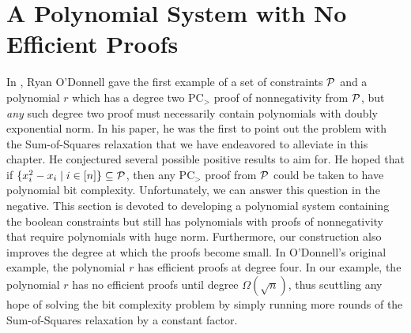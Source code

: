 \section{A Polynomial System with No Efficient Proofs}
In \cite{ODon16}, Ryan O'Donnell gave the first example of a set of constraints $\mathcal P$ and a polynomial $r$ which has a degree two PC$_>$ proof of nonnegativity from $\mathcal P$, but \emph{any} such degree two proof must necessarily contain polynomials with doubly exponential norm. In his paper, he was the first to point out the problem with the Sum-of-Squares relaxation that we have endeavored to alleviate in this chapter. He conjectured several possible positive results to aim for. He hoped that if $\{x_i^2 - x_i \mid i \in [n]\} \subseteq \mathcal P$, then any PC$_>$ proof from $\mathcal P$ could be taken to have polynomial bit complexity. Unfortunately, we can answer this question in the negative. This section is devoted to developing a polynomial system containing the boolean constraints but still has polynomials with proofs of nonnegativity that require polynomials with huge norm. Furthermore, our construction also improves the degree at which the proofs become small. In O'Donnell's original example, the polynomial $r$ has efficient proofs at degree four. In our example, the polynomial $r$ has no efficient proofs until degree $\Omega(\sqrt{n})$, thus scuttling any hope of solving the bit complexity problem by simply running more rounds of the Sum-of-Squares relaxation by a constant factor.

